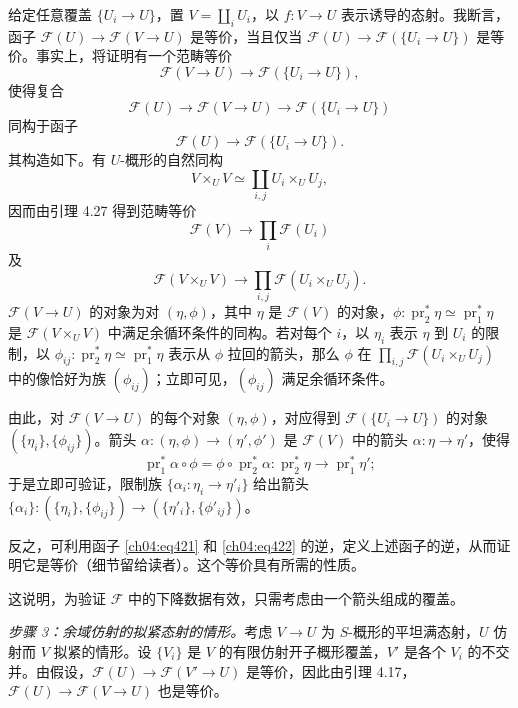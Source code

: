 给定任意覆盖 $\{U_i\to U\}$，置 $V=\coprod_i U_i$，以 $f\colon V\to U$ 表示诱导的态射。我断言，函子 $\mathcal F(U)\to\mathcal F(V\to U)$ 是等价，当且仅当 $\mathcal F(U)\to\mathcal F(\{U_i\to U\})$ 是等价。事实上，将证明有一个范畴等价
\[
 \mathcal F(V\to U)\longrightarrow\mathcal F(\{U_i\to U\}),
\]
使得复合
\[
 \mathcal F(U)\longrightarrow\mathcal F(V\to U)\longrightarrow\mathcal F(\{U_i\to U\})
\]
同构于函子
\[
 \mathcal F(U)\longrightarrow\mathcal F(\{U_i\to U\}).
\]
其构造如下。有 $U$-概形的自然同构
\[
 V\times_U V\simeq\coprod_{i,j}U_i\times_U U_j,
\]
因而由引理 4.27 得到范畴等价
\begin{equation}\tag{4.2.1}\label{ch04:eq421}
 \mathcal F(V)\longrightarrow\prod_i\mathcal F(U_i)
\end{equation}
及
\begin{equation}\tag{4.2.2}\label{ch04:eq422}
 \mathcal F(V\times_U V)\longrightarrow\prod_{i,j}\mathcal F(U_i\times_U U_j).
\end{equation}
$\mathcal F(V\to U)$ 的对象为对 $(\eta,\phi)$，其中 $\eta$ 是 $\mathcal F(V)$ 的对象，$\phi\colon\operatorname{pr}_2^*\eta\simeq\operatorname{pr}_1^*\eta$ 是 $\mathcal F(V\times_U V)$ 中满足余循环条件的同构。若对每个 $i$，以 $\eta_i$ 表示 $\eta$ 到 $U_i$ 的限制，以 $\phi_{ij}\colon\operatorname{pr}_2^*\eta\simeq\operatorname{pr}_1^*\eta$ 表示从 $\phi$ 拉回的箭头，那么 $\phi$ 在 $\prod_{i,j}\mathcal F(U_i\times_U U_j)$ 中的像恰好为族 $(\phi_{ij})$；立即可见，$(\phi_{ij})$ 满足余循环条件。

由此，对 $\mathcal F(V\to U)$ 的每个对象 $(\eta,\phi)$，对应得到 $\mathcal F(\{U_i\to U\})$ 的对象 $(\{\eta_i\},\{\phi_{ij}\})$。箭头 $\alpha\colon(\eta,\phi)\to(\eta',\phi')$ 是 $\mathcal F(V)$ 中的箭头 $\alpha\colon\eta\to\eta'$，使得
\[
 \operatorname{pr}_1^*\alpha\circ\phi
 =\phi\circ\operatorname{pr}_2^*\alpha\colon\operatorname{pr}_2^*\eta\longrightarrow\operatorname{pr}_1^*\eta';
\]
于是立即可验证，限制族 $\{\alpha_i\colon\eta_i\to\eta'_i\}$ 给出箭头
$\{\alpha_i\}\colon(\{\eta_i\},\{\phi_{ij}\})\to(\{\eta'_i\},\{\phi'_{ij}\})$。

反之，可利用函子 \eqref{ch04:eq421} 和 \eqref{ch04:eq422} 的逆，定义上述函子的逆，从而证明它是等价（细节留给读者）。这个等价具有所需的性质。

这说明，为验证 $\mathcal F$ 中的下降数据有效，只需考虑由一个箭头组成的覆盖。

\emph{步骤 3：余域仿射的拟紧态射的情形。}考虑 $V\to U$ 为 $S$-概形的平坦满态射，$U$ 仿射而 $V$ 拟紧的情形。设 $\{V_i\}$ 是 $V$ 的有限仿射开子概形覆盖，$V'$ 是各个 $V_i$ 的不交并。由假设，$\mathcal F(U)\to\mathcal F(V'\to U)$ 是等价，因此由引理 4.17，$\mathcal F(U)\to\mathcal F(V\to U)$ 也是等价。

